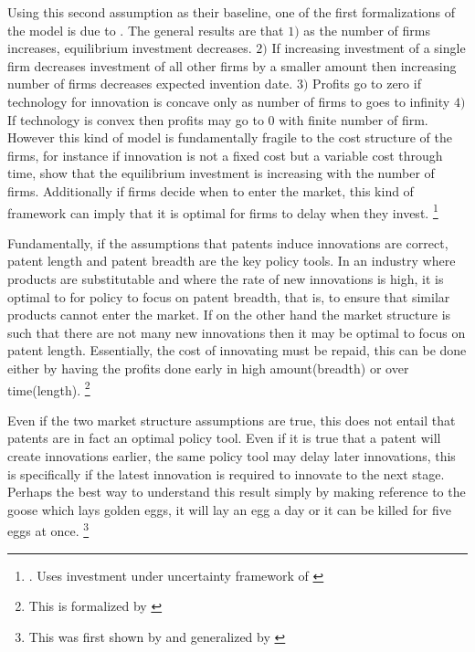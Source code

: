 \documentclass[12pt]{article}
\numberwithin{equation}{section}
\begin{document}
Using this second assumption as their baseline, one of the first formalizations of the model is due to \cite{Loury1979}. The general results are that $1)$ as the number of firms increases, equilibrium investment decreases. $2)$ If increasing investment of a single firm decreases investment of all other firms by a smaller amount then increasing number of firms decreases expected invention date. $3)$ Profits go to zero if technology for innovation is concave only as number of firms to goes to infinity $4)$ If technology is convex then profits may go to 0 with finite number of firm. However this kind of model is fundamentally fragile to the cost structure of the firms, for instance if innovation is not a fixed cost but a variable cost through time, \cite{lee1980market} show that the equilibrium investment is increasing with the number of firms. Additionally if firms decide when to enter the market, this kind of framework can imply that it is optimal for firms to delay when they invest. \footnote{\cite{Weeds2002}. Uses investment under uncertainty framework of \cite{dixit1994investment}}

Fundamentally, if the assumptions that patents induce innovations are correct, patent length and patent breadth are the key policy tools. In an industry where products are substitutable and where the rate of new innovations is high, it is optimal to for policy to focus on patent breadth, that is, to ensure that similar products cannot enter the market. If on the other hand the market structure is such that there are not many new innovations then it may be optimal to focus on patent length. Essentially, the cost of innovating must be repaid, this can be done either by having the profits done early in high amount(breadth) or over time(length). \footnote{This is formalized by \cite{takalo2001optimal}}

Even if the two market structure assumptions are true, this does not entail that patents are in fact an optimal policy tool. Even if it is true that a patent will create innovations earlier, the same policy tool may delay later innovations, this is specifically if the latest innovation is required to innovate to the next stage. Perhaps the best way to understand this result simply by making reference to the goose which lays golden eggs, it will lay an egg a day or it can be killed for five eggs at once. \footnote{This was first shown by \cite{bessen_maskin} and generalized by \cite{Bryan2017}}
\end{document}
